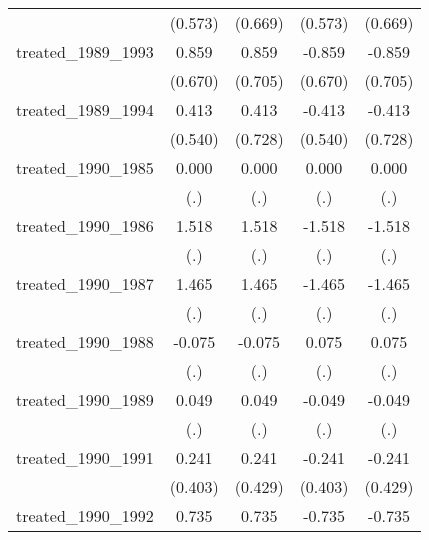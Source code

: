 {\begin{tabular}{l*{4}{c}}
            &     (0.573)         &     (0.669)         &     (0.573)         &     (0.669)         \\
[1em]
treated\_1989\_1993&       0.859         &       0.859         &      -0.859         &      -0.859         \\
            &     (0.670)         &     (0.705)         &     (0.670)         &     (0.705)         \\
[1em]
treated\_1989\_1994&       0.413         &       0.413         &      -0.413         &      -0.413         \\
            &     (0.540)         &     (0.728)         &     (0.540)         &     (0.728)         \\
[1em]
treated\_1990\_1985&       0.000         &       0.000         &       0.000         &       0.000         \\
            &         (.)         &         (.)         &         (.)         &         (.)         \\
[1em]
treated\_1990\_1986&       1.518         &       1.518         &      -1.518         &      -1.518         \\
            &         (.)         &         (.)         &         (.)         &         (.)         \\
[1em]
treated\_1990\_1987&       1.465         &       1.465         &      -1.465         &      -1.465         \\
            &         (.)         &         (.)         &         (.)         &         (.)         \\
[1em]
treated\_1990\_1988&      -0.075         &      -0.075         &       0.075         &       0.075         \\
            &         (.)         &         (.)         &         (.)         &         (.)         \\
[1em]
treated\_1990\_1989&       0.049         &       0.049         &      -0.049         &      -0.049         \\
            &         (.)         &         (.)         &         (.)         &         (.)         \\
[1em]
treated\_1990\_1991&       0.241         &       0.241         &      -0.241         &      -0.241         \\
            &     (0.403)         &     (0.429)         &     (0.403)         &     (0.429)         \\
[1em]
treated\_1990\_1992&       0.735         &       0.735         &      -0.735         &      -0.735         \\

\end{tabular}}

